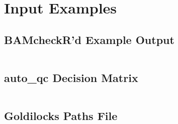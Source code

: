 \chapter{Input Examples}

\section{BAMcheckR'd Example Output}
\label{app:bamcheckr}
\inputminted[fontsize=\scriptsize]{text}{Appendix1/example.bamcheck.SN.txt}

\section{auto\_qc Decision Matrix}
\label{app:aqc_matrix}
\inputminted[fontsize=\scriptsize]{text}{Appendix1/example.aqc.txt}

\section{Goldilocks Paths File}
\label{app:pathsfile}
\inputminted[fontsize=\scriptsize]{text}{Appendix1/paths.g}
